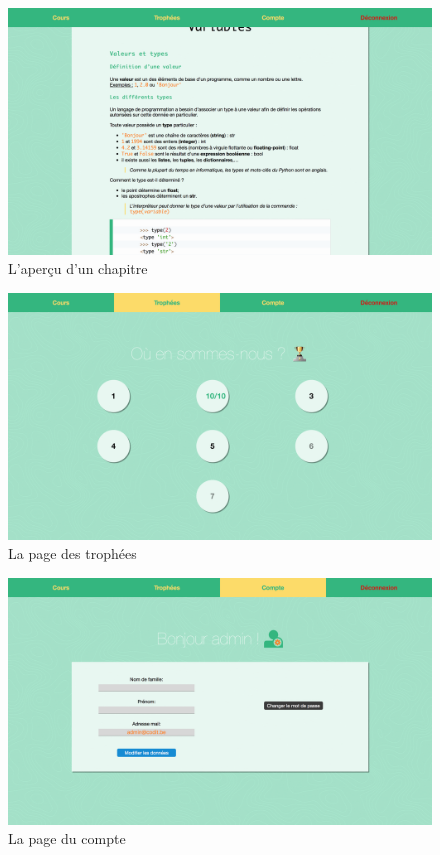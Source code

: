 \begin{figure}[!h]
    \centering
    \includegraphics[scale=0.14]{textures/images/annexes/site/22-Cours.png}
    \caption{L'aperçu d'un chapitre}
\end{figure}
\begin{figure}[!h]
    \centering
    \includegraphics[scale=0.14]{textures/images/annexes/site/3-Trophees.png}
    \caption{La page des trophées}
\end{figure}

\newpage

\begin{figure}[!h]
    \centering
    \includegraphics[scale=0.14]{textures/images/annexes/site/4-Compte.png}
    \caption{La page du compte}
\end{figure}